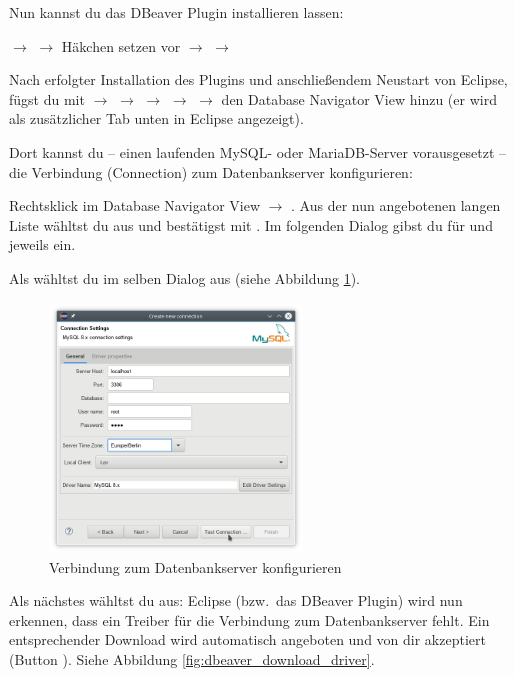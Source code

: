 Nun kannst du das DBeaver Plugin installieren lassen:

$\rightarrow$  $\rightarrow$ Häkchen setzen vor
 $\rightarrow$  $\rightarrow$

Nach erfolgter Installation des Plugins und anschließendem Neustart von Eclipse,
fügst du mit  $\rightarrow$  $\rightarrow$
 $\rightarrow$  $\rightarrow$ 
 $\rightarrow$  den Database Navigator View 
hinzu (er wird als zusätzlicher Tab unten in Eclipse angezeigt).

Dort kannst du -- einen laufenden MySQL- oder MariaDB-Server vorausgesetzt -- die
Verbindung (Connection) zum Datenbankserver konfigurieren:

Rechtsklick im Database Navigator View $\rightarrow$ . 
Aus der nun angebotenen langen Liste wähltst du  aus und bestätigst 
mit . Im folgenden Dialog gibst du für  und 
 jeweils  ein.

Als  wähltst du im selben Dialog 
aus (siehe Abbildung \ref{fig:dbeaver_connection_settings}).

\begin{figure}[h]
  \centering
   \includegraphics[width=0.6\textwidth]{./inf/SEKII/01_Vorbereitung/dbeaver_connection_settings.png}
   \caption{Verbindung zum Datenbankserver konfigurieren}
   \label{fig:dbeaver_connection_settings}
\end{figure}

Als nächstes wähltst du  aus: Eclipse (bzw.\ das DBeaver 
Plugin) wird nun erkennen, dass ein Treiber für die Verbindung zum Datenbankserver
fehlt. Ein entsprechender Download wird automatisch angeboten und von dir akzeptiert
(Button ). Siehe Abbildung \ref{fig:dbeaver_download_driver}.

